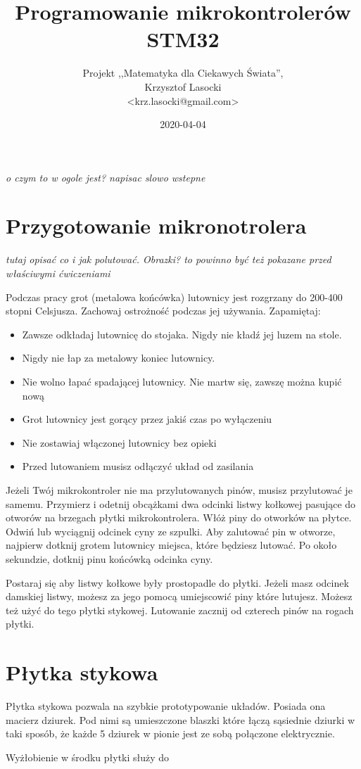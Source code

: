 \documentclass{pdfBooklets}
\title{Programowanie mikrokontrolerów STM32}
\author{%
	Projekt ,,Matematyka dla Ciekawych Świata'',\\
	Krzysztof Lasocki\\\normalsize\ttfamily <krz.lasocki@gmail.com>
}
\date  {2020-04-04}
\begin{document}
\maketitle


\textit{o czym to w ogole jest? napisac slowo wstepne}

\section{Przygotowanie mikronotrolera}
\textit{tutaj opisać co i jak polutować. Obrazki? to powinno być też pokazane przed właściwymi ćwiczeniami}
\begin{ProTip}{}
  Podczas pracy grot (metalowa końcówka) lutownicy jest rozgrzany do 200-400 stopni Celsjusza. Zachowaj ostrożność
  podczas jej używania. Zapamiętaj:
  \begin{itemize}
  \item Zawsze odkładaj lutownicę do stojaka. Nigdy nie kładź jej luzem na stole.
  \item Nigdy nie łap za metalowy koniec lutownicy.
  \item Nie wolno łapać spadającej lutownicy. Nie martw się, zawszę można kupić nową
  \item Grot lutownicy jest gorący przez jakiś czas po wyłączeniu
  \item Nie zostawiaj włączonej lutownicy bez opieki
  \item Przed lutowaniem musisz odłączyć układ od zasilania
  \end{itemize}
\end{ProTip}

Jeżeli Twój mikrokontroler nie ma przylutowanych pinów, musisz przylutować je samemu. Przymierz i odetnij
obcążkami dwa odcinki listwy kołkowej pasujące do otworów na brzegach płytki mikrokontrolera. Włóż piny do otworków
na płytce. Odwiń lub wyciągnij odcinek cyny ze szpulki. Aby zalutować pin w otworze, najpierw dotknij grotem lutownicy
miejsca, które będziesz lutować. Po około sekundzie, dotknij pinu końcówką odcinka cyny.

Postaraj się aby listwy kołkowe były prostopadle do płytki. Jeżeli masz odcinek damskiej listwy, możesz za jego pomocą
umiejscowić piny które lutujesz. Możesz też użyć do tego płytki stykowej. Lutowanie zacznij od czterech pinów na rogach płytki.


\section{Płytka stykowa}
  Płytka stykowa pozwala na szybkie prototypowanie układów. Posiada ona macierz dziurek. Pod nimi są umieszczone
  blaszki które łączą sąsiednie dziurki w taki sposób, że każde 5 dziurek w pionie jest ze sobą połączone elektrycznie.
  
  Wyżłobienie w środku płytki służy do 
\end{document}

